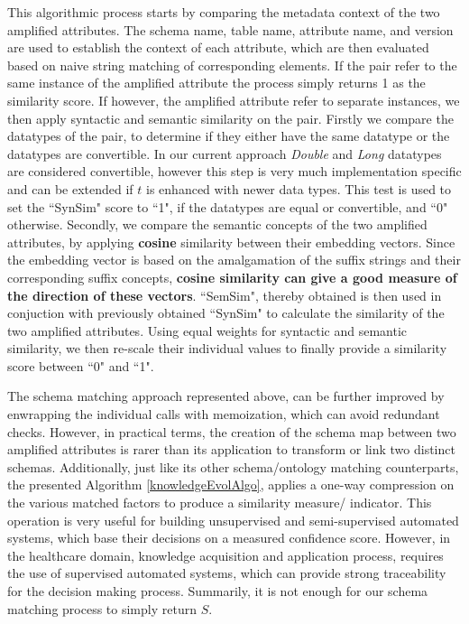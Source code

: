 This algorithmic process starts by comparing the metadata context of the two amplified attributes. The schema name, table name, attribute name, and version are used to establish the context of each attribute, which are then evaluated based on naive string matching of corresponding elements. If the pair refer to the same instance of the amplified attribute the process simply returns 1 as the similarity score. If however, the amplified attribute refer to separate instances, we then apply syntactic and semantic similarity on the pair. Firstly we compare the datatypes of the pair, to determine if they either have the same datatype or the datatypes are convertible. In our current approach \textit{Double} and \textit{Long} datatypes are considered convertible, however this step is very much implementation specific and can be extended if $t$ is enhanced with newer data types. This test is used to set the ``SynSim" score to ``1", if the datatypes are equal or convertible, and ``0" otherwise. Secondly, we compare the semantic concepts of the two amplified attributes, by applying \textbf{cosine} similarity between their embedding vectors. Since the embedding vector is based on the amalgamation of the suffix strings and their corresponding suffix concepts, \textbf{cosine similarity can give a good measure of the direction of these vectors}. ``SemSim", thereby obtained is then used in conjuction with previously obtained ``SynSim" to calculate the similarity of the two amplified attributes. Using equal weights for syntactic and semantic similarity, we then re-scale their individual values to finally provide a similarity score between ``0" and ``1". 

The schema matching approach represented above, can be further improved by enwrapping the individual calls with memoization, which can avoid redundant checks. However, in practical terms, the creation of the schema map between two amplified attributes is rarer than its application to transform or link two distinct schemas. Additionally, just like its other schema/ontology matching counterparts, the presented Algorithm \ref{knowledgeEvolAlgo}, applies a one-way compression on the various matched factors to produce a similarity measure/ indicator. This operation is very useful for building unsupervised and semi-supervised automated systems, which base their decisions on a measured confidence score. However, in the healthcare domain, knowledge acquisition and application process, requires the use of supervised automated systems, which can provide strong traceability for the decision making process. Summarily, it is not enough for our schema matching process to simply return $S$.

